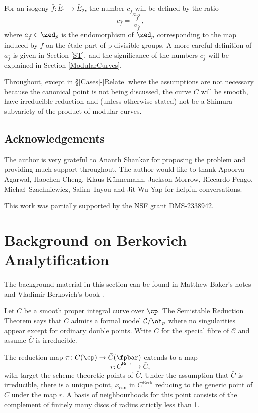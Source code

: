 \documentclass[12pt,letterpaper]{article}
\begin{document}
	For an isogeny $\bar{f}\colon \bar{E}_1\to\bar{E}_2$, the number $c_{\bar{f}}$ will be defined by the ratio \[c_{\bar{f}}=\frac{a_{\bar{f}^T}}{a_{\bar{f}}},\] where $a_{\bar{f}}\in \zed_p$ is the endomorphism of $\zed_p$ corresponding to the map induced by $\bar{f}$ on the \'etale part of p-divisible groups. A more careful definition of $a_{\bar{f}}$ is given in Section \ref{ST}, and the significance of the numbers $c_{\bar{f}}$ will be explained in Section \ref{ModularCurves}.
	
	Throughout, except in \S\ref{Cases}-\ref{Relate} where the assumptions are not necessary because the canonical point is not being discussed, the curve $C$ will be smooth, have irreducible reduction and (unless otherwise stated) not be a Shimura subvariety of the product of modular curves.	
	
	
	
	\subsection{Acknowledgements}
	
	The author is very grateful to Ananth Shankar for proposing the problem and providing much support throughout. The author would like to thank Apoorva Agarwal, Haochen Cheng, Klaus K\"unnemann, Jackson Morrow, Riccardo Pengo, Micha\l \ Szachniewicz, Salim Tayou and Jit-Wu Yap for helpful conversations.
	
	This work was partially supported by the NSF grant DMS-2338942.
	
	
	
	
	
	
	
	\section{Background on Berkovich Analytification}\label{Berk}
	
	The background material in this section can be found in Matthew Baker's notes \cite{Bak07} and Vladimir Berkovich's book \cite{Ber90}.
	
	Let $C$ be a smooth proper integral curve over $\cp$. The Semistable Reduction Theorem says that $C$ admits a formal model $\mathcal{C}/\oh_p$ where no singularities appear except for ordinary double points. Write $\bar{C}$ for the special fibre of $\mathcal{C}$ and assume $\bar{C}$ is irreducible.
	
	The reduction map $\pi\colon C(\cp)\to \bar{C}(\fpbar)$ extends to a map
	\[r\colon C^\text{Berk}\to \bar{C},\] with target the scheme-theoretic points of $\bar{C}$. Under the assumption that $\bar{C}$ is irreducible, there is a unique point, $x_\text{can}$ in $C^\text{Berk}$ reducing to the generic point of $\bar{C}$ under the map $r$. A basis of neighbourhoods for this point consists of the complement of finitely many discs of radius strictly less than 1.
	
\end{document}
